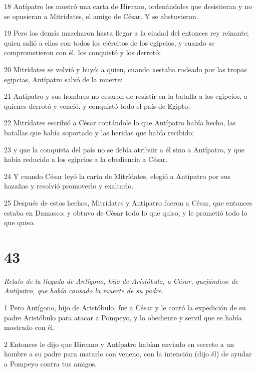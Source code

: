 \par 18 Antípatro les mostró una carta de Hircano, ordenándoles que desistieran y no se opusieran a Mitrídates, el amigo de César. Y se abstuvieron.

\par 19 Pero los demás marcharon hasta llegar a la ciudad del entonces rey reinante; quien salió a ellos con todos los ejércitos de los egipcios, y cuando se comprometieron con él, los conquistó y los derrotó;

\par 20 Mitrídates se volvió y huyó; a quien, cuando «estaba rodeado por las tropas egipcias, Antípatro salvó de la muerte:

\par 21 Antípatro y sus hombres no cesaron de resistir en la batalla a los egipcios, a quienes derrotó y venció, y conquistó todo el país de Egipto.

\par 22 Mitrídates escribió a César contándole lo que Antípatro había hecho, las batallas que había soportado y las heridas que había recibido;

\par 23 y que la conquista del país no se debía atribuir a él sino a Antípatro, y que había reducido a los egipcios a la obediencia a César.

\par 24 Y cuando César leyó la carta de Mitrídates, elogió a Antípatro por sus hazañas y resolvió promoverlo y exaltarlo.

\par 25 Después de estos hechos, Mitrídates y Antípatro fueron a César, que entonces estaba en Damasco; y obtuvo de César todo lo que quiso, y le prometió todo lo que quiso.

\chapter{43}

\par \textit{Relato de la llegada de Antígono, hijo de Aristóbulo, a César, quejándose de Antípatro, que había causado la muerte de su padre.}

\par 1 Pero Antígono, hijo de Aristóbulo, fue a César y le contó la expedición de su padre Aristóbulo para atacar a Pompeyo, y lo obediente y servil que se había mostrado con él.

\par 2 Entonces le dijo que Hircano y Antípatro habían enviado en secreto a un hombre a su padre para matarlo con veneno, con la intención (dijo él) de ayudar a Pompeyo contra tus amigos.

